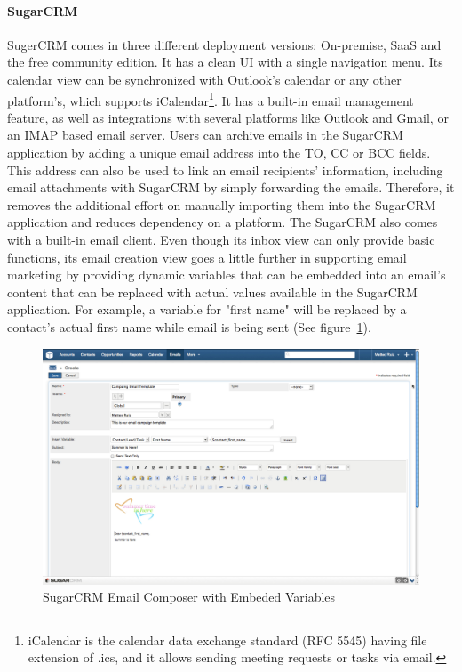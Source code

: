 \paragraph{SugarCRM}
SugerCRM comes in three different deployment versions: On-premise, \ac{SaaS} and the free community edition. It has a clean \ac{UI} with a single navigation menu. Its calendar view can be synchronized with Outlook's calendar or any other platform's, which supports iCalendar\footnote{iCalendar is the calendar data exchange standard (RFC 5545) having file extension of .ics, and it allows sending meeting requests or tasks via email.}. It has a built-in email management feature, as well as integrations with several platforms like Outlook and Gmail, or an \ac{IMAP} based email server. Users can archive emails in the SugarCRM application by adding a unique email address into the TO, \ac{CC} or \ac{BCC} fields. This address can also be used to link an email recipients' information, including email attachments with SugarCRM by simply forwarding the emails. Therefore, it removes the additional effort on manually importing them into the SugarCRM application and reduces dependency on a platform. The SugarCRM also comes with a built-in email client. Even though its inbox view can only provide basic functions, its email creation view goes a little further in supporting email marketing by providing dynamic variables that can be embedded into an email's content that can be replaced with actual values available in the SugarCRM application. For example, a variable for "first name" will be replaced by a contact's actual first name while email is being sent (See figure~\ref{fig:SugarCRM-Create_Email}). 
\vspace{1cm}

\begin{figure}[htbp]
	\centering
	\includegraphics[width=1.00\textwidth]{imgs/SugarCRM-Create_Email.png}
	\caption[SugarCRM Email Composer with Embeded Variables]{SugarCRM Email Composer with Embeded Variables \citep{SugarCRMInc.2013}}
	\label{fig:SugarCRM-Create_Email}
\end{figure}


